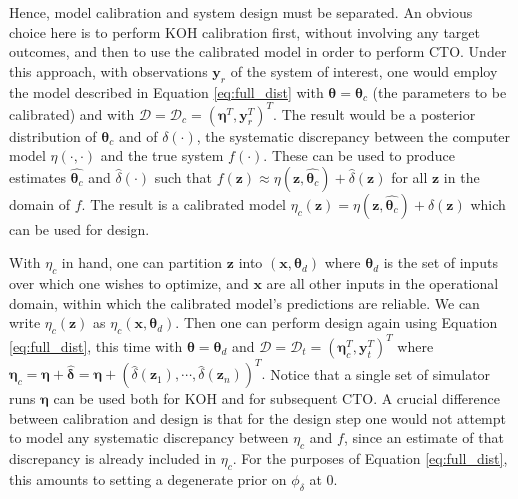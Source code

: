 \documentclass[twocolumn,10pt]{asme2ej}
\begin{document}
%
Hence, model calibration and system design must be separated.
%
An obvious choice here is to perform KOH calibration first, without involving any target outcomes, and then to use the calibrated model in order to perform CTO.
%
Under this approach, with observations $
\mathbf y_r$ of the system of interest, one would employ the model described in Equation \eqref{eq:full_dist} with $\boldsymbol \theta = \boldsymbol \theta_c$ (the parameters to be calibrated) and with $\mathcal D = \mathcal D_c = (\boldsymbol\eta^T, \mathbf y_r ^T)^T$.
%
The result would be a posterior distribution of $\boldsymbol \theta_c$ and of $\delta(\cdot)$, the systematic discrepancy between the computer model $\eta(\cdot,\cdot)$ and the true system $f(\cdot)$.
%
These can be used to produce estimates $\widehat{\boldsymbol\theta_c}$ and $\widehat\delta(\cdot)$ such that $f(\mathbf z)\approx\eta(\mathbf z,\widehat{\boldsymbol\theta_c})+\widehat\delta(\mathbf z)$ for all $\mathbf z$ in the domain of $f$.
%
The result is a calibrated model $\eta_c(\mathbf z)=\eta(\mathbf z,\widehat{\boldsymbol\theta_c})+\widehat\delta(\mathbf z)$ which can be used for design.
%

%
With $\eta_c$ in hand, one can partition $\mathbf z$ into $(\mathbf x,\boldsymbol\theta_d)$ where $\boldsymbol\theta_d$ is the set of inputs over which one wishes to optimize, and $\mathbf x$ are all other inputs in the operational domain, within which the calibrated model's predictions are reliable.
%
We can write $\eta_c(\mathbf z)$ as $\eta_c(\mathbf x,\boldsymbol\theta_d)$.
%
Then one can perform design again using Equation \eqref{eq:full_dist}, this time with $\boldsymbol\theta = \boldsymbol\theta_d$ and $\mathcal D = \mathcal D_t = (\boldsymbol\eta_c^T,\mathbf y_t^T)^T$ where $\boldsymbol\eta_c = \boldsymbol \eta+ \widehat{\boldsymbol \delta}= \boldsymbol \eta+ (\widehat\delta(\mathbf z_1), \cdots, \widehat\delta(\mathbf z_n))^T.$
%
Notice that a single set of simulator runs $\boldsymbol\eta$ can be used both for KOH and for subsequent CTO.
%
A crucial difference between calibration and design is that for the design step one would not attempt to model any systematic discrepancy between $\eta_c$ and $f$, since an estimate of that discrepancy is already included in $\eta_c$.
%
For the purposes of Equation \eqref{eq:full_dist}, this amounts to setting a degenerate prior on $\phi_\delta$ at 0.
%
\end{document}
